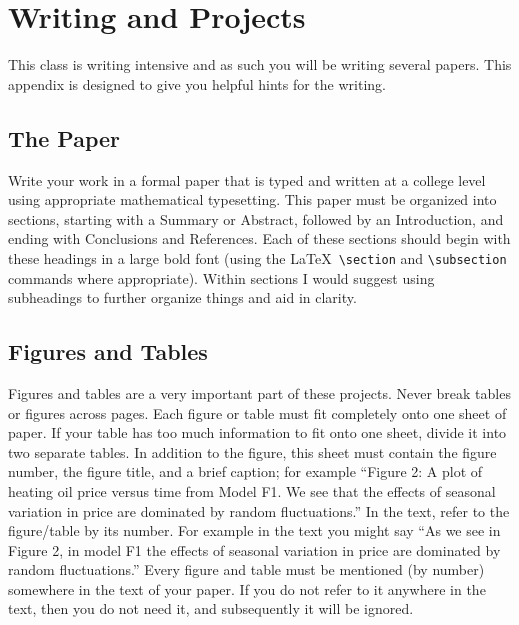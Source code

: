 \chapter{Writing and Projects}\label{app:writing_projects}
This class is writing intensive and as such you will be writing several papers.  This
appendix is designed to give you helpful hints for the writing.

\section{The Paper} 
Write your work in a formal paper that is typed and written at a college level using
appropriate mathematical typesetting. This paper must be organized into sections, starting
with a Summary or Abstract, followed by an Introduction, and ending with Conclusions and
References. Each of these sections should begin with these headings in a large bold font
(using the \LaTeX\ \verb|\section| and \verb|\subsection| commands where appropriate).
Within sections I would suggest using subheadings to further organize things and aid in
clarity.

\section{Figures and Tables}
Figures and tables are a very important part of these projects. Never break tables or
figures across pages. Each figure or table must fit completely onto one sheet of paper. If
your table has too much information to fit onto one sheet, divide it into two separate
tables. In addition to the figure, this sheet must contain the figure number, the figure
title, and a brief caption; for example ``Figure 2: A plot of heating oil price versus time
from Model F1. We see that the effects of seasonal variation in price are dominated by
random fluctuations.'' In the text, refer to the figure/table by its number. For example in
the text you might say ``As we see in Figure 2, in model F1 the effects of seasonal 
variation in price are dominated by random fluctuations.'' Every figure and table must be
mentioned (by number) somewhere in the text of your paper. If you do not refer to it
anywhere in the text, then you do not need it, and subsequently it will be ignored.


